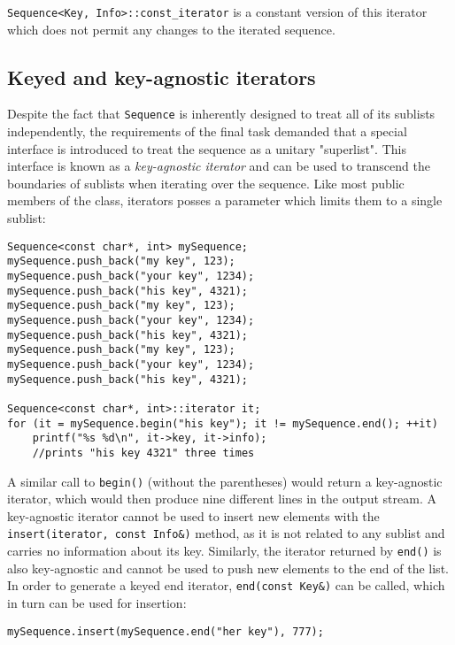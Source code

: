 ﻿\documentclass{article}
\begin{document}
{\tt Sequence<Key, Info>::const\_iterator} is a constant version of this
iterator which does not permit any changes to the iterated sequence.

\subsection{Keyed and key-agnostic iterators}

Despite the fact that {\tt Sequence} is inherently designed to treat all of its
sublists independently, the requirements of the final task demanded that a
special interface is introduced to treat the sequence as a unitary "superlist".
This interface is known as a {\it key-agnostic iterator} and can be used to
transcend the boundaries of sublists when iterating over the sequence.
Like most public members of the class, iterators posses a parameter which limits
them to a single sublist: 

\begin{verbatim}
Sequence<const char*, int> mySequence;
mySequence.push_back("my key", 123);
mySequence.push_back("your key", 1234);
mySequence.push_back("his key", 4321);
mySequence.push_back("my key", 123);
mySequence.push_back("your key", 1234);
mySequence.push_back("his key", 4321);
mySequence.push_back("my key", 123);
mySequence.push_back("your key", 1234);
mySequence.push_back("his key", 4321);

Sequence<const char*, int>::iterator it;
for (it = mySequence.begin("his key"); it != mySequence.end(); ++it)
    printf("%s %d\n", it->key, it->info);
    //prints "his key 4321" three times

\end{verbatim}

A similar call to {\tt begin()} (without the parentheses) would return a
key-agnostic iterator, which would then produce nine different lines in the
output stream.
A key-agnostic iterator cannot be used to insert new elements with the
{\tt insert(iterator, const Info\&)} method, as it is not related to any sublist
and carries no information about its key. Similarly, the iterator returned by
{\tt end()} is also key-agnostic and cannot be used to push new elements to
the end of the list. In order to generate a keyed end iterator,
{\tt end(const Key\&)} can be called, which in turn can be used for insertion:

\begin{verbatim}
mySequence.insert(mySequence.end("her key"), 777);
\end{verbatim}
\end{document}
